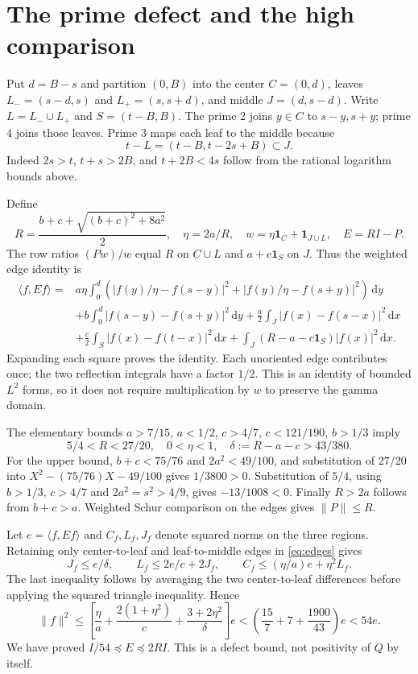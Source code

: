 \documentclass[11pt]{article}
\newcommand{\dd}{\,\mathrm d}
\newcommand{\norm}[1]{\lVert#1\rVert}
\newcommand{\ip}[2]{\langle#1,#2\rangle}
\begin{document}
\section{The prime defect and the high comparison}
Put $d=B-s$ and partition $(0,B)$ into the center $C=(0,d)$, leaves $L_-=(s-d,s)$ and $L_+=(s,s+d)$, and middle $J=(d,s-d)$. Write $L=L_-\cup L_+$ and $S=(t-B,B)$. The prime $2$ joins $y\in C$ to $s-y,s+y$; prime $4$ joins those leaves. Prime $3$ maps each leaf to the middle because
\[
 t-L=(t-B,t-2s+B)\subset J.
\]
Indeed $2s>t$, $t+s>2B$, and $t+2B<4s$ follow from the rational logarithm bounds above.

Define
\[
 R=\frac{b+c+\sqrt{(b+c)^2+8a^2}}2,\quad
 \eta=2a/R,\quad w=\eta\mathbf1_C+\mathbf1_{J\cup L},\quad E=RI-P.
\]
The row ratios $(Pw)/w$ equal $R$ on $C\cup L$ and $a+c\mathbf1_S$ on $J$. Thus the weighted edge identity is
\begin{align}
 \ip f{Ef}={}&a\eta\int_0^d\left(\left|f(y)/\eta-f(s-y)\right|^2
 +\left|f(y)/\eta-f(s+y)\right|^2\right)\dd y\nonumber\\
 &+b\int_0^d|f(s-y)-f(s+y)|^2\dd y
 +\frac a2\int_J|f(x)-f(s-x)|^2\dd x\nonumber\\
 &+\frac c2\int_S|f(x)-f(t-x)|^2\dd x
 +\int_J(R-a-c\mathbf1_S)|f(x)|^2\dd x.\label{eq:edges}
\end{align}
Expanding each square proves the identity. Each unoriented edge contributes once; the two reflection integrals have a factor $1/2$. This is an identity of bounded $L^2$ forms, so it does not require multiplication by $w$ to preserve the gamma domain.

The elementary bounds $a>7/15$, $a<1/2$, $c>4/7$, $c<121/190$, $b>1/3$ imply
\[
 5/4<R<27/20,\quad 0<\eta<1,\quad \delta:=R-a-c>43/380.
\]
For the upper bound, $b+c<75/76$ and $2a^2<49/100$, and substitution of $27/20$ into $X^2-(75/76)X-49/100$ gives $1/3800>0$. Substitution of $5/4$, using $b>1/3$, $c>4/7$ and $2a^2=s^2>4/9$, gives $-13/1008<0$. Finally $R>2a$ follows from $b+c>a$. Weighted Schur comparison on the edges gives $\norm P\le R$.

Let $e=\ip f{Ef}$ and $C_f,L_f,J_f$ denote squared norms on the three regions. Retaining only center-to-leaf and leaf-to-middle edges in \eqref{eq:edges} gives
\[
 J_f\le e/\delta,\qquad L_f\le2e/c+2J_f,
 \qquad C_f\le(\eta/a)e+\eta^2L_f.
\]
The last inequality follows by averaging the two center-to-leaf differences before applying the squared triangle inequality. Hence
\[
 \norm f^2\le\left[\frac\eta a+\frac{2(1+\eta^2)}c
 +\frac{3+2\eta^2}\delta\right]e
 <\left(\frac{15}7+7+\frac{1900}{43}\right)e<54e.
\]
We have proved $I/54\preceq E\preceq2RI$. This is a defect bound, not positivity of $Q$ by itself.
\end{document}
